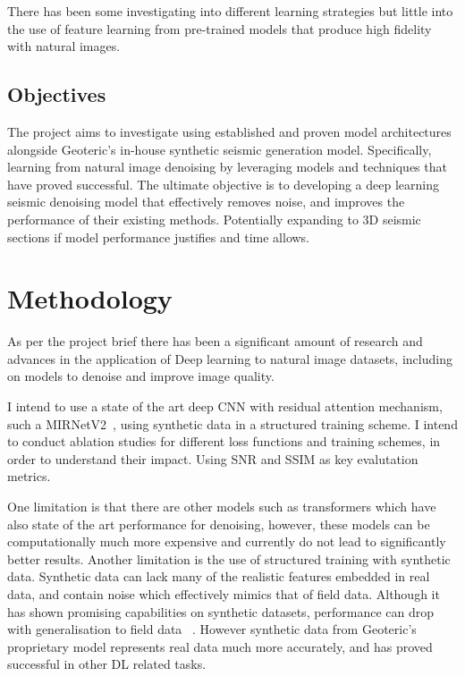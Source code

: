 \documentclass[project-plan]{report-template}
\begin{document}
There has been some investigating into different learning strategies but little into the use of feature learning from pre-trained models that produce high fidelity with natural images.


\subsection{Objectives}
The project aims to investigate using established and proven model architectures alongside Geoteric's in-house synthetic seismic generation model. Specifically, learning from natural image denoising by leveraging models and techniques that have proved successful. The ultimate objective is to developing a deep learning seismic denoising model that effectively removes noise, and improves the performance of their existing methods. Potentially expanding to 3D seismic sections if model performance justifies and time allows.


\section{Methodology}
As per the project brief there has been a significant amount of research and advances in the application of Deep learning to natural image datasets, including on models to denoise and improve image quality.

I intend to use a state of the art deep CNN with residual attention mechanism, such a MIRNetV2~\cite{zamir2022mirnetv2}, using synthetic data in a structured training scheme. I intend to conduct ablation studies for different loss functions and training schemes, in order to understand their impact. Using SNR and SSIM as key evalutation metrics.

One limitation is that there are other models such as transformers which have also state of the art performance for denoising, however, these models can be computationally much more expensive and currently do not lead to significantly better results.  Another limitation is the use of structured training with synthetic data. Synthetic data can lack many of the realistic features embedded in real data, and contain noise which effectively mimics that of field data. Although it has shown promising capabilities on synthetic datasets, performance can drop with generalisation to field data ~\cite{zhang2019unsupervised}. However synthetic data from Geoteric's proprietary model represents real data much more accurately, and has proved successful in other DL related tasks.
\end{document}
